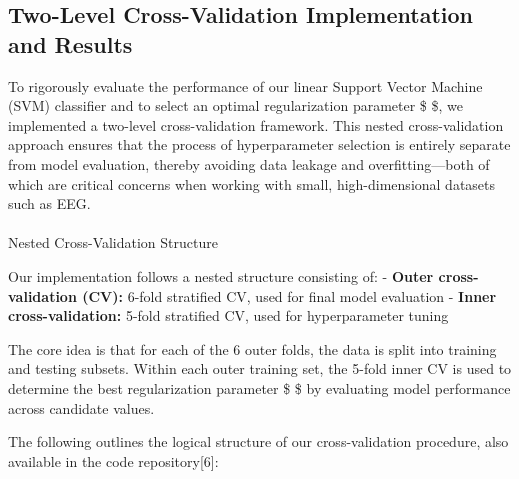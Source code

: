 \documentclass[
  letterpaper,
  DIV=11,
  numbers=noendperiod]{scrartcl}
\makeatletter
\let\oldparagraph\paragraph
\renewcommand{\paragraph}{
    \@ifstar
      \xxxParagraphStar
      \xxxParagraphNoStar
  }
\newcommand{\xxxParagraphStar}[1]{\oldparagraph*{#1}\mbox{}}
\newcommand{\xxxParagraphNoStar}[1]{\oldparagraph{#1}\mbox{}}
\makeatother
\begin{document}
\subsection{Two-Level Cross-Validation Implementation and
Results}\label{two-level-cross-validation-implementation-and-results}

To rigorously evaluate the performance of our linear Support Vector
Machine (SVM) classifier and to select an optimal regularization
parameter \$ \alpha \$, we implemented a two-level cross-validation
framework. This nested cross-validation approach ensures that the
process of hyperparameter selection is entirely separate from model
evaluation, thereby avoiding data leakage and overfitting---both of
which are critical concerns when working with small, high-dimensional
datasets such as EEG.

\paragraph{Nested Cross-Validation
Structure}\label{nested-cross-validation-structure}

Our implementation follows a nested structure consisting of: -
\textbf{Outer cross-validation (CV):} 6-fold stratified CV, used for
final model evaluation - \textbf{Inner cross-validation:} 5-fold
stratified CV, used for hyperparameter tuning

The core idea is that for each of the 6 outer folds, the data is split
into training and testing subsets. Within each outer training set, the
5-fold inner CV is used to determine the best regularization parameter
\$ \alpha \$ by evaluating model performance across candidate values.

The following outlines the logical structure of our cross-validation
procedure, also available in the code repository{[}6{]}:
\end{document}
